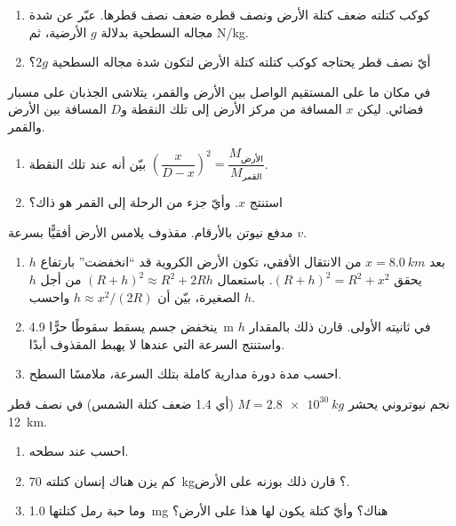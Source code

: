 \begin{exercise}[$\star\star$]\label{exo:g10:universal-gravitation:11}
\begin{enumerate}
  \item كوكب كتلته ضعف كتلة الأرض ونصف قطره ضعف نصف قطرها.
        عبّر عن شدة مجاله السطحية بدلالة $g$
        الأرضية، ثم  \unit{N/kg}.
  \item أيّ نصف قطر يحتاجه كوكب كتلته كتلة الأرض لتكون شدة
        مجاله السطحية $2g$؟
\end{enumerate}
\end{exercise}

\begin{exercise}[$\star\star\star$]\label{exo:g10:universal-gravitation:12}
في مكان ما على المستقيم الواصل بين الأرض والقمر، يتلاشى الجذبان على مسبار
فضائي. ليكن $x$ المسافة من مركز الأرض إلى تلك النقطة
و$D$ المسافة بين الأرض والقمر.
\begin{enumerate}
  \item بيّن أنه عند تلك النقطة
        $\left(\dfrac{x}{D - x}\right)^{2}
        = \dfrac{M_{\text{الأرض}}}{M_{\text{القمر}}}$.
  \item استنتج $x$. وأيّ جزء من الرحلة إلى القمر هو ذاك؟
\end{enumerate}
\end{exercise}

\begin{exercise}[$\star\star\star$]\label{exo:g10:universal-gravitation:13}
مدفع نيوتن بالأرقام. مقذوف يلامس الأرض
أفقيًّا بسرعة $v$.
\begin{enumerate}
  \item بعد $x = \qty{8.0}{km}$ من الانتقال الأفقي، تكون الأرض
        الكروية قد ``انخفضت'' بارتفاع $h$ يحقق
        $(R + h)^2 = R^2 + x^2$. باستعمال
        $(R + h)^2 \approx R^2 + 2Rh$ من أجل $h$ الصغيرة، بيّن أن
        $h \approx x^2 / (2R)$ واحسب $h$.
  \item ينخفض جسم يسقط سقوطًا حرًّا \qty{4.9}{m} في ثانيته الأولى.
        قارن ذلك بالمقدار $h$ واستنتج السرعة التي عندها لا يهبط
        المقذوف أبدًا.
  \item احسب مدة دورة مدارية كاملة بتلك السرعة، ملامسًا
        السطح.
\end{enumerate}
\end{exercise}

\begin{exercise}[$\star\star\star$]\label{exo:g10:universal-gravitation:14}
نجم نيوتروني يحشر $M = \qty{2.8e30}{kg}$ (أي 1.4 ضعف كتلة الشمس)
في نصف قطر \qty{12}{km}.
\begin{enumerate}
  \item احسب  عند سطحه.
  \item كم يزن هناك إنسان كتلته \qty{70}{kg}؟ قارن ذلك بوزنه
        على الأرض.
  \item وما  حبة رمل كتلتها \qty{1.0}{mg} هناك؟
        وأيّ كتلة يكون لها هذا  على الأرض؟
\end{enumerate}
\end{exercise}

